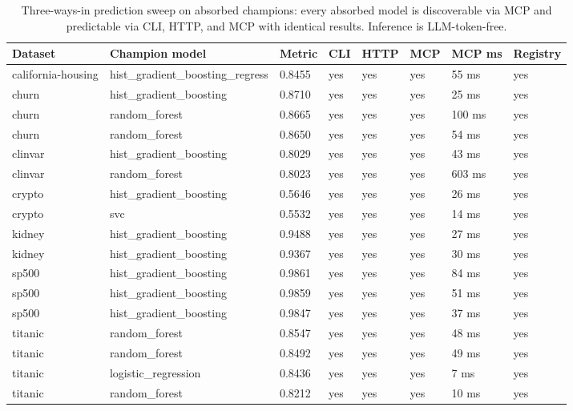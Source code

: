 \begin{table}[H]
\centering\small
\caption{Three-ways-in prediction sweep on absorbed champions: every absorbed model is discoverable via MCP and predictable via CLI, HTTP, and MCP with identical results. Inference is LLM-token-free.}
\label{tab:predictions-prediction-sweep-full}
\begin{tabular}{llllllll}
\toprule
Dataset & Champion model & Metric & CLI & HTTP & MCP & MCP ms & Registry \\
\midrule
california-housing & hist\_gradient\_boosting\_regress & 0.8455 & yes & yes & yes & 55 ms & yes \\
churn & hist\_gradient\_boosting & 0.8710 & yes & yes & yes & 25 ms & yes \\
churn & random\_forest & 0.8665 & yes & yes & yes & 100 ms & yes \\
churn & random\_forest & 0.8650 & yes & yes & yes & 54 ms & yes \\
clinvar & hist\_gradient\_boosting & 0.8029 & yes & yes & yes & 43 ms & yes \\
clinvar & random\_forest & 0.8023 & yes & yes & yes & 603 ms & yes \\
crypto & hist\_gradient\_boosting & 0.5646 & yes & yes & yes & 26 ms & yes \\
crypto & svc & 0.5532 & yes & yes & yes & 14 ms & yes \\
kidney & hist\_gradient\_boosting & 0.9488 & yes & yes & yes & 27 ms & yes \\
kidney & hist\_gradient\_boosting & 0.9367 & yes & yes & yes & 30 ms & yes \\
sp500 & hist\_gradient\_boosting & 0.9861 & yes & yes & yes & 84 ms & yes \\
sp500 & hist\_gradient\_boosting & 0.9859 & yes & yes & yes & 51 ms & yes \\
sp500 & hist\_gradient\_boosting & 0.9847 & yes & yes & yes & 37 ms & yes \\
titanic & random\_forest & 0.8547 & yes & yes & yes & 48 ms & yes \\
titanic & random\_forest & 0.8492 & yes & yes & yes & 49 ms & yes \\
titanic & logistic\_regression & 0.8436 & yes & yes & yes & 7 ms & yes \\
titanic & random\_forest & 0.8212 & yes & yes & yes & 10 ms & yes \\
\bottomrule
\end{tabular}
\end{table}
